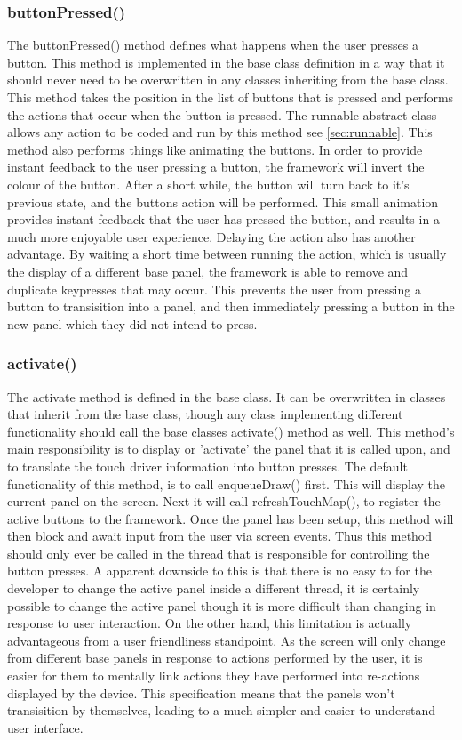 \subsubsection{buttonPressed()}
\label{sec:base:butpress}
The buttonPressed() method defines what happens when the user presses a button. This method is implemented in the base class definition in a way that it should never need to be overwritten in any classes inheriting from the base class. This method takes the position in the list of buttons that is pressed and performs the actions that occur when the button is pressed. The runnable abstract class allows any action to be coded and run by this method see \ref{sec:runnable}. This method also performs things like animating the buttons. In order to provide instant feedback to the user pressing a button, the framework will invert the colour of the button. After a short while, the button will turn back to it's previous state, and the buttons action will be performed. This small animation provides instant feedback that the user has pressed the button, and results in a much more enjoyable user experience. Delaying the action also has another advantage. By waiting a short time between running the action, which is usually the display of a different base panel, the framework is able to remove and duplicate keypresses that may occur. This prevents the user from pressing a button to transisition into a panel, and then immediately pressing a button in the new panel which they did not intend to press.

\subsubsection{activate()}

The activate method is defined in the base class. It can be overwritten in classes that inherit from the base class, though any class implementing different functionality should call the base classes activate() method as well. This method's main responsibility is to display or 'activate' the panel that it is called upon, and to translate the touch driver information into button presses. The default functionality of this method, is to call enqueueDraw() first. This will display the current panel on the screen. Next it will call refreshTouchMap(), to register the active buttons to the framework. Once the panel has been setup, this method will then block and await input from the user via screen events. Thus this method should only ever be called in the thread that is responsible for controlling the button presses. A apparent downside to this is that there is no easy to for the developer to change the active panel inside a different thread, it is certainly possible to change the active panel though it is more difficult than changing in response to user interaction. On the other hand, this limitation is actually advantageous from a user friendliness standpoint. As the screen will only change from different base panels in response to actions performed by the user, it is easier for them to mentally link actions they have performed into re-actions displayed by the device. This specification means that the panels won't transisition by themselves, leading to a much simpler and easier to understand user interface. 

